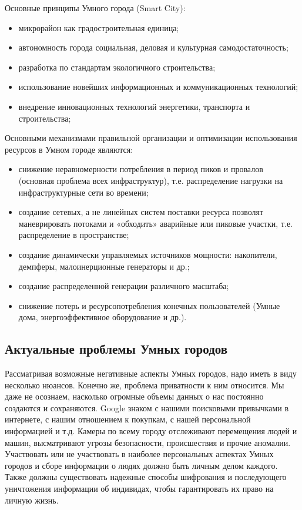   Основные принципы Умного города (Smart City): 
  \begin{itemize}
  \item микрорайон как градостроительная единица; 
  \item автономность города социальная, деловая и  культурная самодостаточность;
  \item разработка по стандартам экологичного строительства; 
  \item использование новейших информационных и коммуникационных технологий;
  \item внедрение инновационных технологий энергетики, транспорта и строительства;
\end{itemize}

  Основными механизмами правильной организации и  оптимизации использования ресурсов в Умном городе являются: 
  \begin{itemize}
  \item снижение неравномерности потребления в период пиков и провалов (основная проблема всех инфраструктур), т.е. распределение нагрузки на инфраструктурные сети во времени; 
  \item создание сетевых, а не линейных систем поставки ресурса позволят маневрировать потоками и «обходить» аварийные или пиковые участки, т.е. распределение в пространстве; 
  \item создание динамически управляемых источников мощности: накопители, демпферы, малоинерционные генераторы и др.; 
  \item создание распределенной генерации различного масштаба;
  \item снижение потерь и ресурсопотребления конечных пользователей (Умные дома, энергоэффективное оборудование и др.).
\end{itemize}

\subsection{Актуальные проблемы Умных городов}
Рассматривая возможные негативные аспекты Умных городов, надо иметь в виду несколько нюансов.\cite{Almanah} Конечно же, проблема приватности к ним относится. Мы даже не осознаем, насколько огромные объемы данных о нас постоянно создаются и сохраняются. Google знаком с нашими поисковыми привычками в интернете, с нашим отношением к покупкам, с нашей персональной информацией и т.д. Камеры по всему городу отслеживают перемещения людей и машин, высматривают угрозы безопасности, происшествия и прочие аномалии. Участвовать или не участвовать в наиболее персональных аспектах Умных городов и сборе информации о людях должно быть личным делом каждого. Также должны существовать надежные способы шифрования и последующего уничтожения информации об индивидах, чтобы гарантировать их право на личную жизнь.

